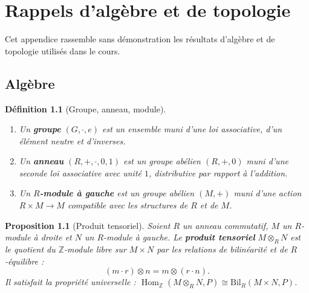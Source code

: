 \documentclass[a4paper,12pt]{book}
\DeclareMathOperator{\Hom}{Hom}
\newcommand{\Z}{\mathbb{Z}}
\newtheorem{proposition}[theoreme]{Proposition}
\newtheorem{definition}[theoreme]{Définition}
\begin{document}



\appendix

\chapter{Rappels d'algèbre et de topologie}\label{app:rappels}
\minitoc

\vspace{1em}

Cet appendice rassemble sans démonstration les résultats d'algèbre
et de topologie utilisés dans le cours.

\section{Algèbre}\label{sec:rappels-algebre}


\begin{definition}[Groupe, anneau, module]\label{def:rappel-structures}
\begin{enumerate}[label=(\roman*)]
\item Un \textbf{groupe} $(G, \cdot, e)$ est un ensemble muni d'une
      loi associative, d'un élément neutre et d'inverses.

\item Un \textbf{anneau} $(R, +, \cdot, 0, 1)$ est un groupe abélien
      $(R, +, 0)$ muni d'une seconde loi associative avec unité $1$,
      distributive par rapport à l'addition.

\item Un \textbf{$R$-module à gauche} est un groupe abélien $(M, +)$
      muni d'une action $R \times M \to M$ compatible avec les
      structures de $R$ et de $M$.
\end{enumerate}
\end{definition}

\begin{proposition}[Produit tensoriel]\label{prop:rappel-tensoriel}
Soient $R$ un anneau commutatif, $M$ un $R$-module à droite et $N$
un $R$-module à gauche.  Le \textbf{produit tensoriel}
$M \otimes_R N$ est le quotient du $\Z$-module libre sur
$M \times N$ par les relations de bilinéarité et de $R$-équilibre :
\[
  (m \cdot r) \otimes n = m \otimes (r \cdot n).
\]
Il satisfait la propriété universelle :
$\Hom_\Z(M \otimes_R N, P) \cong \mathrm{Bil}_R(M \times N, P)$.
\end{proposition}
\end{document}
